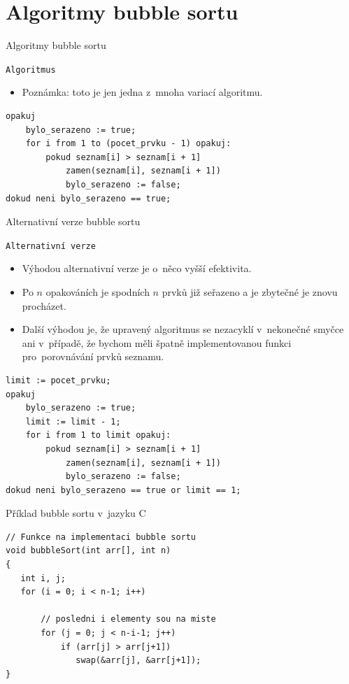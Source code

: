 \documentclass[10pt, hyperref={unicode}]{beamer}
\begin{document}
\section{Algoritmy bubble sortu}

\begin{frame}[fragile]{Algoritmy bubble sortu}
	\begin{alertblock}{\texttt{Algoritmus}}
		\begin{itemize}
			\item Poznámka: toto je jen jedna z~mnoha variací algoritmu. 
		\end{itemize}
	\end{alertblock}

\begin{lstlisting}
opakuj
    bylo_serazeno := true;
    for i from 1 to (pocet_prvku - 1) opakuj:
        pokud seznam[i] > seznam[i + 1]
            zamen(seznam[i], seznam[i + 1])
            bylo_serazeno := false;
dokud neni bylo_serazeno == true;
\end{lstlisting}
\end{frame}

\begin{frame}[fragile]{Alternativní verze bubble sortu}
	\begin{alertblock}{\texttt{Alternativní verze}}
		\begin{itemize}
			\item Výhodou alternativní verze je o~něco vyšší efektivita. 
			\item Po $n$ opakováních je spodních $n$ prvků již seřazeno a je zbytečné je znovu procházet. 
			\item Další výhodou je, že upravený algoritmus se nezacyklí v~nekonečné smyčce ani v~případě, že bychom měli špatně implementovanou funkci pro~porovnávání prvků seznamu. 
		\end{itemize}
	\end{alertblock}

\begin{lstlisting}
limit := pocet_prvku;
opakuj
    bylo_serazeno := true;
    limit := limit - 1;
    for i from 1 to limit opakuj:
        pokud seznam[i] > seznam[i + 1]
            zamen(seznam[i], seznam[i + 1])
            bylo_serazeno := false;
dokud neni bylo_serazeno == true or limit == 1;
\end{lstlisting}
\end{frame}

\begin{frame}[fragile]{Příklad bubble sortu v~jazyku C}

\begin{lstlisting}
// Funkce na implementaci bubble sortu
void bubbleSort(int arr[], int n) 
{ 
   int i, j; 
   for (i = 0; i < n-1; i++)       
  
       // posledni i elementy sou na miste
       for (j = 0; j < n-i-1; j++)  
           if (arr[j] > arr[j+1]) 
              swap(&arr[j], &arr[j+1]); 
} 
\end{lstlisting}
\end{frame}
\end{document}
